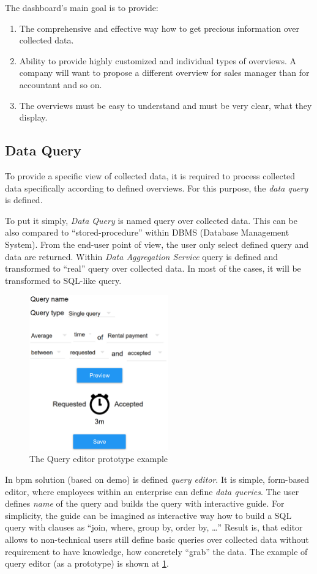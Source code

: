 The dashboard's main goal is to provide:
\begin{enumerate}
\item The comprehensive and effective way how to get precious information over collected data.
\item Ability to provide highly customized and individual types of overviews. A company will want to propose a different overview for sales manager than for accountant and so on. 
\item The overviews must be easy to understand and must be very clear, what they display.
\end{enumerate}
\subsection{Data Query}
To provide a specific view of collected data, it is required to process collected data specifically according to defined overviews. For this purpose, the \textit{data query} is defined.

To put it simply, \textit{Data Query} is named query over collected data. This can be also compared to ``stored-procedure'' within DBMS (Database Management System). From the end-user point of view, the user only select defined query and data are returned. Within \textit{Data Aggregation Service} query is defined and transformed to ``real'' query over collected data. In most of the cases, it will be transformed to SQL-like query. 

\begin{figure}[ht!]
\centering
\includegraphics[width=6cm,keepaspectratio]{img/query-editor}
\caption{The Query editor prototype example}
\label{fig:query-editor}
\end{figure}

In \gls{bpm} solution (based on \gls{demo}) is defined \textit{query editor}. It is simple, form-based editor, where employees within an enterprise can define \textit{data queries}. The user defines \textit{name} of the query and builds the query with interactive guide. For simplicity, the guide can be imagined as interactive way how to build a SQL query with clauses as ``join, where, group by, order by, \dots'' Result is, that editor allows to non-technical users still define basic queries over collected data without requirement to have knowledge, how concretely ``grab'' the data. The example of query editor (as a prototype) is shown at \cref{fig:query-editor}.

